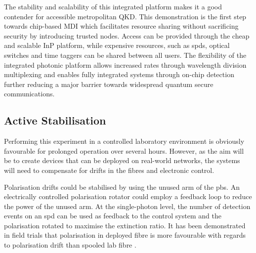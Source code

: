 

The stability and scalability of this integrated platform makes it a good contender for accessible metropolitan \ac{QKD}. This demonstration is the first step towards chip-based \ac{MDI} which facilitates resource sharing without sacrificing security by introducing trusted nodes. Access can be provided through the cheap and scalable \ac{InP} platform, while expensive resources, such as \acp{spd}, optical switches and time taggers can be shared between all users. The flexibility of the integrated photonic platform allows increased rates through wavelength division multiplexing \cite{price2018} and enables fully integrated systems through on-chip detection \cite{akhlaghi2015} further reducing a major barrier towards widespread quantum secure communications.

\subsection{Active Stabilisation}

Performing this experiment in a controlled laboratory environment is obviously favourable for prolonged operation over several hours. However, as the aim will be to create devices that can be deployed on real-world networks, the systems will need to compensate for drifts in the fibres and electronic control.


Polarisation drifts could be stabilised by using the unused arm of the \ac{pbs}. An electrically controlled polarisation rotator could employ a feedback loop to reduce the power of the unused arm. At the single-photon level, the number of detection events on an \ac{spd} can be used as feedback to the control system and the polarisation rotated to maximise the extinction ratio. It has been demonstrated in field trials that polarisation in deployed fibre is more favourable with regards to polarisation drift than spooled lab fibre \cite{wengerowsky2019}.

